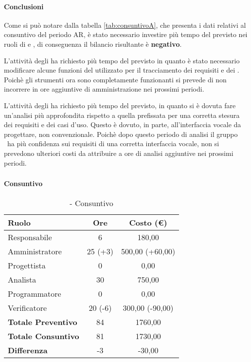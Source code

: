 \documentclass[./PianoDiProgetto.tex]{subfiles}
\begin{document}
  \paragraph{Conclusioni}
		Come si può notare dalla tabella \ref{tab:consuntivoA}, che presenta i dati relativi al consuntivo del periodo AR, è stato necessario investire più tempo del previsto nei ruoli di  \AMM{} e \AN, di conseguenza il bilancio risultante è \textbf{negativo}.

		L'attività degli \AMMP{} ha richiesto più tempo del previsto in quanto è stato necessario modificare alcune funzioni del  utilizzato per il tracciamento dei requisiti e dei . Poichè gli strumenti ora sono completamente funzionanti si prevede di non incorrere in ore aggiuntive di amministrazione nei prossimi periodi.

		L'attività degli \ANP{} ha richiesto più tempo del previsto, in quanto si è dovuta fare un'analisi più approfondita rispetto a quella prefissata per una corretta stesura dei requisiti e dei casi d'uso.
		Questo è dovuto, in parte, all'interfaccia vocale da progettare, non convenzionale.
		Poichè dopo questo periodo di analisi il gruppo \GRUPPO\ ha più confidenza sui requisiti di una corretta interfaccia vocale, non si prevedono ulteriori costi da attribuire a ore di analisi aggiuntive nei prossimi periodi.

\subsubsection{\PerAD}
	\paragraph{Consuntivo}
	\begin{table}[h]
		\centering
		\begin{tabular}{l * {2}{c}}
			\toprule
			\textbf{Ruolo} & \textbf{Ore} & \textbf{Costo (\euro{})} \\
			\midrule
			Responsabile &	6 & 180,00 \\
			Amministratore & 25 (+3)  & 500,00 (+60,00)\\
			Progettista & 0 & 0,00 \\
			Analista & 30 & 750,00\\
			Programmatore & 0 & 0,00 \\
			Verificatore & 20 (-6) & 300,00 (-90,00)\\
			\midrule
			\textbf{Totale Preventivo} & 84
 & 1760,00
 \\
			\textbf{Totale Consuntivo} & 81 & 1730,00 \\
			\midrule
			\textbf{Differenza} & -3 & -30,00 \\
			\bottomrule
		\end{tabular}
		\caption{\PerAD{} - Consuntivo}

	\end{table}
\end{document}
